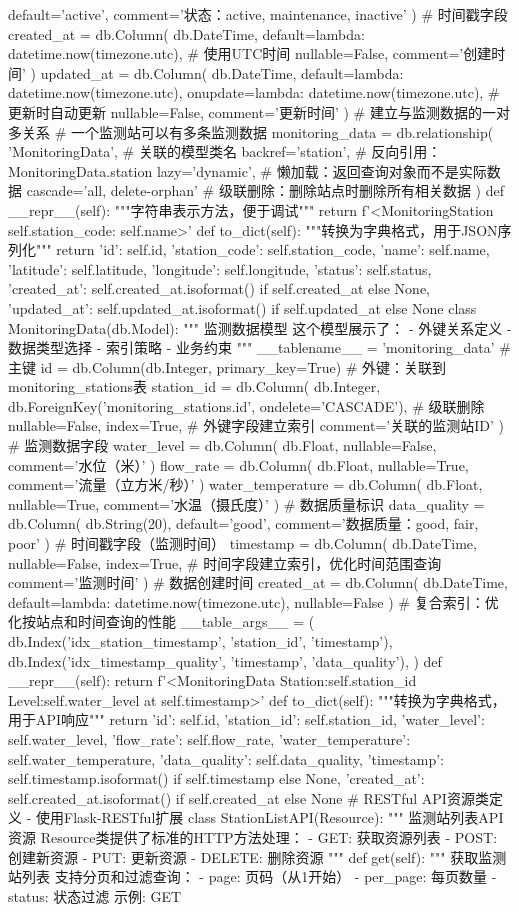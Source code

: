 {{{{{{default='active', comment='状态：active, maintenance, inactive' ) # 时间戳字段 created_at = db.Column( db.DateTime, default=lambda: datetime.now(timezone.utc), # 使用UTC时间 nullable=False, comment='创建时间' ) updated_at = db.Column( db.DateTime, default=lambda: datetime.now(timezone.utc), onupdate=lambda: datetime.now(timezone.utc), # 更新时自动更新 nullable=False, comment='更新时间' ) # 建立与监测数据的一对多关系 # 一个监测站可以有多条监测数据 monitoring_data = db.relationship( 'MonitoringData', # 关联的模型类名 backref='station', # 反向引用：MonitoringData.station lazy='dynamic', # 懒加载：返回查询对象而不是实际数据 cascade='all, delete-orphan' # 级联删除：删除站点时删除所有相关数据 ) def __repr__(self): """字符串表示方法，便于调试""" return f'<MonitoringStation {self.station_code}: {self.name}>' def to_dict(self): """转换为字典格式，用于JSON序列化""" return { 'id': self.id, 'station_code': self.station_code, 'name': self.name, 'latitude': self.latitude, 'longitude': self.longitude, 'status': self.status, 'created_at': self.created_at.isoformat() if self.created_at else None, 'updated_at': self.updated_at.isoformat() if self.updated_at else None } class MonitoringData(db.Model): """ 监测数据模型 这个模型展示了： - 外键关系定义 - 数据类型选择 - 索引策略 - 业务约束 """ __tablename__ = 'monitoring_data' # 主键 id = db.Column(db.Integer, primary_key=True) # 外键：关联到monitoring_stations表 station_id = db.Column( db.Integer, db.ForeignKey('monitoring_stations.id', ondelete='CASCADE'), # 级联删除 nullable=False, index=True, # 外键字段建立索引 comment='关联的监测站ID' ) # 监测数据字段 water_level = db.Column( db.Float, nullable=False, comment='水位（米）' ) flow_rate = db.Column( db.Float, nullable=True, comment='流量（立方米/秒）' ) water_temperature = db.Column( db.Float, nullable=True, comment='水温（摄氏度）' ) # 数据质量标识 data_quality = db.Column( db.String(20), default='good', comment='数据质量：good, fair, poor' ) # 时间戳字段（监测时间） timestamp = db.Column( db.DateTime, nullable=False, index=True, # 时间字段建立索引，优化时间范围查询 comment='监测时间' ) # 数据创建时间 created_at = db.Column( db.DateTime, default=lambda: datetime.now(timezone.utc), nullable=False ) # 复合索引：优化按站点和时间查询的性能 __table_args__ = ( db.Index('idx_station_timestamp', 'station_id', 'timestamp'), db.Index('idx_timestamp_quality', 'timestamp', 'data_quality'), ) def __repr__(self): return f'<MonitoringData Station:{self.station_id} Level:{self.water_level} at {self.timestamp}>' def to_dict(self): """转换为字典格式，用于API响应""" return { 'id': self.id, 'station_id': self.station_id, 'water_level': self.water_level, 'flow_rate': self.flow_rate, 'water_temperature': self.water_temperature, 'data_quality': self.data_quality, 'timestamp': self.timestamp.isoformat() if self.timestamp else None, 'created_at': self.created_at.isoformat() if self.created_at else None } # RESTful API资源类定义 - 使用Flask-RESTful扩展 class StationListAPI(Resource): """ 监测站列表API资源 Resource类提供了标准的HTTP方法处理： - GET: 获取资源列表 - POST: 创建新资源 - PUT: 更新资源 - DELETE: 删除资源 """ def get(self): """ 获取监测站列表 支持分页和过滤查询： - page: 页码（从1开始） - per_page: 每页数量 - status: 状态过滤 示例: GET }}}}}}
